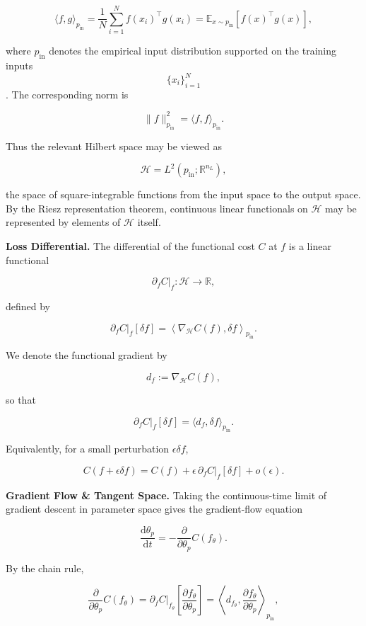 \[
\langle f, g \rangle_{p_{\mathrm{in}}}
=
\frac{1}{N}
\sum_{i=1}^{N}
f(x_i)^{\top} g(x_i)
=
\mathbb{E}_{x \sim p_{\mathrm{in}}}
\left[
f(x)^{\top} g(x)
\right],
\]

where \(p_{\mathrm{in}}\) denotes the empirical input distribution supported on the training inputs \[ \{x_i\}_{i=1}^{N} \]. The corresponding norm is

\[
\|f\|_{p_{\mathrm{in}}}^{2}
=
\langle f,f\rangle_{p_{\mathrm{in}}}.
\]

Thus the relevant Hilbert space may be viewed as

\[
\mathcal{H}
=
L^{2}\!\left(p_{\mathrm{in}};\mathbb{R}^{n_L}\right),
\]

the space of square-integrable functions from the input space to the output space. By the Riesz representation theorem, continuous linear functionals on \(\mathcal{H}\) may be represented by elements of \(\mathcal{H}\) itself.

\textbf{Loss Differential.} The differential of the functional cost \(C\) at \(f\) is a linear functional

\[
\partial_f C\big|_f : \mathcal{H} \to \mathbb{R},
\]

defined by

\[
\partial_f C\big|_f[\delta f]
=
\left\langle
\nabla_{\mathcal{H}} C(f),
\delta f
\right\rangle_{p_{\mathrm{in}}}.
\]

We denote the functional gradient by

\[
d_f := \nabla_{\mathcal{H}} C(f),
\]

so that

\[
\partial_f C\big|_f[\delta f]
=
\langle d_f,\delta f\rangle_{p_{\mathrm{in}}}.
\]

Equivalently, for a small perturbation \(\epsilon \delta f\),

\[
C(f+\epsilon \delta f)
=
C(f)
+
\epsilon\,
\partial_f C\big|_f[\delta f]
+
o(\epsilon).
\]

\textbf{Gradient Flow \& Tangent Space.} Taking the continuous-time limit of gradient descent in parameter space gives the gradient-flow equation

\[
\frac{\mathrm{d}\theta_p}{\mathrm{d}t}
=
-
\frac{\partial}{\partial \theta_p}
C(f_\theta).
\]

By the chain rule,

\[
\frac{\partial}{\partial \theta_p}
C(f_\theta)
=
\partial_f C\big|_{f_\theta}
\left[
\frac{\partial f_\theta}{\partial \theta_p}
\right]
=
\left\langle
d_{f_\theta},
\frac{\partial f_\theta}{\partial \theta_p}
\right\rangle_{p_{\mathrm{in}}},
\]

